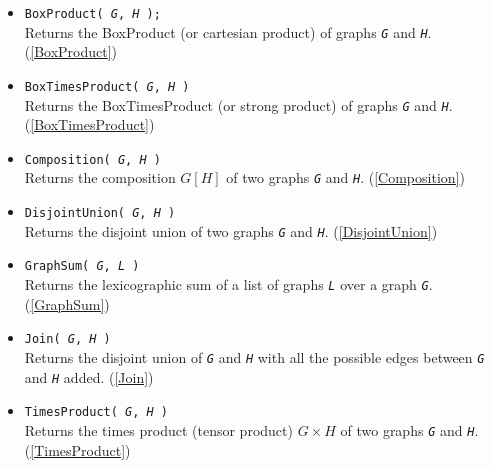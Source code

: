 \documentclass[a4paper,11pt]{report}
\begin{document}
{{\begin{itemize}
\item \texttt{BoxProduct( \mbox{\texttt{\mdseries\slshape G}}, \mbox{\texttt{\mdseries\slshape H}} );}\\
 Returns the BoxProduct (or cartesian product) of graphs \mbox{\texttt{\mdseries\slshape G}} and \mbox{\texttt{\mdseries\slshape H}}. (\ref{BoxProduct}) 
\item \texttt{BoxTimesProduct( \mbox{\texttt{\mdseries\slshape G}}, \mbox{\texttt{\mdseries\slshape H}} )}\\
 Returns the BoxTimesProduct (or strong product) of graphs \mbox{\texttt{\mdseries\slshape G}} and \mbox{\texttt{\mdseries\slshape H}}. (\ref{BoxTimesProduct}) 
\item \texttt{Composition( \mbox{\texttt{\mdseries\slshape G}}, \mbox{\texttt{\mdseries\slshape H}} )}\\
 Returns the composition $G[H]$ of two graphs \mbox{\texttt{\mdseries\slshape G}} and \mbox{\texttt{\mdseries\slshape H}}. (\ref{Composition}) 
\item \texttt{DisjointUnion( \mbox{\texttt{\mdseries\slshape G}}, \mbox{\texttt{\mdseries\slshape H}} )}\\
 Returns the disjoint union of two graphs \mbox{\texttt{\mdseries\slshape G}} and \mbox{\texttt{\mdseries\slshape H}}. (\ref{DisjointUnion}) 
\item \texttt{GraphSum( \mbox{\texttt{\mdseries\slshape G}}, \mbox{\texttt{\mdseries\slshape L}} )}\\
 Returns the lexicographic sum of a list of graphs \mbox{\texttt{\mdseries\slshape L}} over a graph \mbox{\texttt{\mdseries\slshape G}}. (\ref{GraphSum}) 
\item \texttt{Join( \mbox{\texttt{\mdseries\slshape G}}, \mbox{\texttt{\mdseries\slshape H}} )}\\
 Returns the disjoint union of \mbox{\texttt{\mdseries\slshape G}} and \mbox{\texttt{\mdseries\slshape H}} with all the possible edges between \mbox{\texttt{\mdseries\slshape G}} and \mbox{\texttt{\mdseries\slshape H}} added. (\ref{Join}) 
\item \texttt{TimesProduct( \mbox{\texttt{\mdseries\slshape G}}, \mbox{\texttt{\mdseries\slshape H}} )}\\
 Returns the times product (tensor product) $G \times H$ of two graphs \mbox{\texttt{\mdseries\slshape G}} and \mbox{\texttt{\mdseries\slshape H}}. (\ref{TimesProduct}) 
\end{itemize}
 }

}
\end{document}
